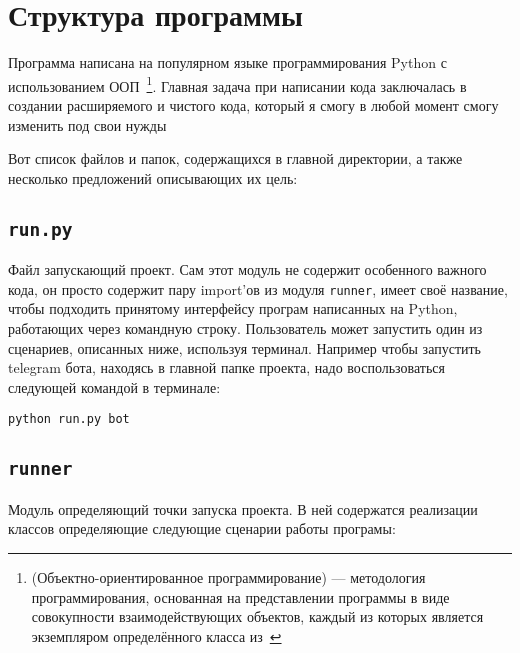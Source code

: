 \chapter{Структура программы}
\label{cha:ch_2}

Программа написана на популярном языке программирования Python с использованием ООП~\footnote{(Объектно-ориентированное программирование) — методология программирования, основанная на представлении программы в виде совокупности взаимодействующих объектов, каждый из которых является экземпляром определённого класса из~\cite{oop-buch}}.  Главная задача при написании кода заключалась в создании расширяемого и чистого кода, который я смогу в любой момент смогу изменить под свои нужды

Вот список файлов и папок, содержащихся в главной директории, а также несколько предложений описывающих их цель:

\section*{\texttt{run.py}}

Файл запускающий проект.  Сам этот модуль не содержит особенного важного кода, он просто содержит пару import'ов из модуля \texttt{runner}, имеет своё название, чтобы подходить принятому интерфейсу програм написанных на Python, работающих через командную строку. Пользователь может запустить один из сценариев, описанных ниже, используя терминал.  Например чтобы запустить telegram бота, находясь в главной папке проекта, надо воспользоваться следующей командой в терминале:

\begin{verbatim}
python run.py bot
\end{verbatim}

\section*{\texttt{runner}}

Модуль определяющий точки запуска проекта.  В ней содержатся реализации классов определяющие следующие сценарии работы програмы:

